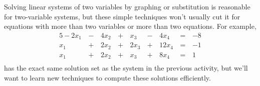 \begin{applicationActivities}
\begin{observation}
  Solving linear systems of two variables by graphing or substitution is
  reasonable for two-variable systems, but these simple techniques
  won't usually cut it for equations with
  more than two variables or more than two equations. For example,
  \begin{alignat*}{5}
    -2x_1 &\,-\,& 4x_2 &\,+\,&  x_3 &\,-\,&  4x_4 &\,=\,& -8 \\
      x_1 &\,+\,& 2x_2 &\,+\,& 2x_3 &\,+\,& 12x_4 &\,=\,& -1 \\
      x_1 &\,+\,& 2x_2 &\,+\,&  x_3 &\,+\,&  8x_4 &\,=\,&  1 \\
  \end{alignat*}
  has the exact same solution set as the system in the previous
  activity, but we'll want to learn new techniques
  to compute these solutions efficiently.
\end{observation}
\end{applicationActivities}
